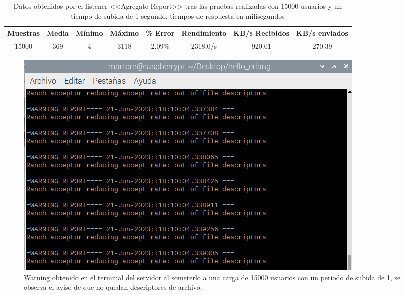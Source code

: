 \begin{table}[h]
\begin{center}
\begin{tabular}{|c|c|c|c|c|c|c|c|}
\rowcolor{gray!20}
\hline
Muestras & Media & Mínimo & Máximo & \% Error & Rendimiento & KB/s Recibidos & KB/s enviados \\
\hline
15000 & 369 & 4 & 3118 & 2.09\% & 2318.0/s & 920.01 & 270.39 \\
\hline
\end{tabular}
\caption[Datos de <<Agregate Report>> con 15000 usuarios]{Datos obtenidos por el listener <<Agregate Report>> tras las pruebas realizadas con 15000 usuarios y un tiempo de subida de 1 segundo, tiempos de respuesta en milisegundos}%
\label{tab:15000User}
\end{center}
\end{table}

\begin{figure}[h]
\centering
\includegraphics{images/warningServerDescriptors.png}
\caption[Warning del servidor por exceso de carga (15000 hilos)]{Warning obtenido en el terminal del servidor al someterlo a una carga de 15000 usuarios con un periodo de subida de 1, se observa el aviso de que no quedan descriptores de archivo.}%
\label{fig:warning}
\end{figure}


